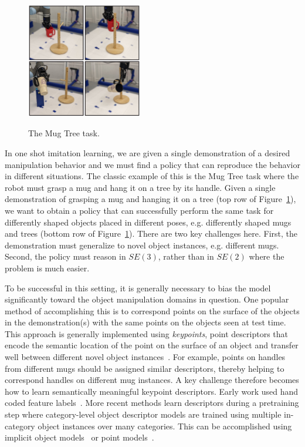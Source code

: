\documentclass{article}
\begin{document}
\begin{figure}
\vspace{-0.5cm}
  \begin{center}
    \includegraphics[width=0.45\textwidth]{figures/intro_1.pdf} \\
    \end{center}
\vspace{-0.2cm}
\caption{The Mug Tree task.}
\label{fig:mugontree}
\end{figure}


In one shot imitation learning, we are given a single demonstration of a desired manipulation behavior and we must find a policy that can reproduce the behavior in different situations. The classic example of this is the Mug Tree task where the robot must grasp a mug and hang it on a tree by its handle. Given a single demonstration of grasping a mug and hanging it on a tree (top row of Figure~\ref{fig:mugontree}), we want to obtain a policy that can successfully perform the same task for differently shaped objects placed in different poses, e.g. differently shaped mugs and trees (bottom row of Figure~\ref{fig:mugontree}). There are two key challenges here. First, the demonstration must generalize to novel object instances, e.g. different mugs. Second, the policy must reason in $SE(3)$, rather than in $SE(2)$ where the problem is much easier. 

To be successful in this setting, it is generally necessary to bias the model significantly toward the object manipulation domains in question. One popular method of accomplishing this is to correspond points on the surface of the objects in the demonstration(s) with the same points on the objects seen at test time. This approach is generally implemented using \emph{keypoints}, point descriptors that encode the semantic location of the point on the surface of an object and transfer well between different novel object instances~\cite{pan2022tax,wang2019dynamic,manuelli2019kpam}. For example, points on handles from different mugs should be assigned similar descriptors, thereby helping to correspond handles on different mug instances. A key challenge therefore becomes how to learn semantically meaningful keypoint descriptors. Early work used hand coded feature labels~\cite{manuelli2019kpam}. More recent methods learn descriptors during a pretraining step where category-level object descriptor models are trained using multiple in-category object instances over many categories. This can be accomplished using implicit object models~\cite{simeonov2022neural} or point models~\cite{pan2022tax}. 
\end{document}

